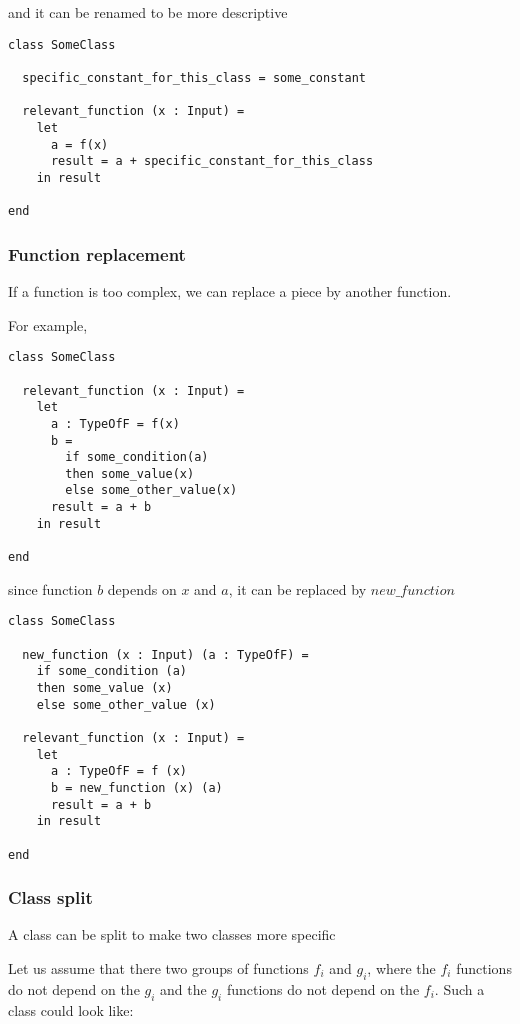 and it can be renamed to be more descriptive

\begin{lstlisting}[label={lst:rewritingFunctionExtractionAfter1}]
class SomeClass

  specific_constant_for_this_class = some_constant

  relevant_function (x : Input) =
    let
      a = f(x)
      result = a + specific_constant_for_this_class
    in result

end
\end{lstlisting}

\subsubsection{Function replacement}

If a function is too complex, we can replace a piece by another function.

For example,

\begin{lstlisting}[label={lst:rewritingFunctionReplacementBefore}]
class SomeClass

  relevant_function (x : Input) =
    let
      a : TypeOfF = f(x)
      b =
        if some_condition(a)
        then some_value(x)
        else some_other_value(x)
      result = a + b
    in result

end
\end{lstlisting}

since function $b$ depends on $x$ and $a$, it can be replaced by $new\_function$

\begin{lstlisting}[label={lst:rewritingFunctionReplacementAfter}]
class SomeClass

  new_function (x : Input) (a : TypeOfF) =
    if some_condition (a)
    then some_value (x)
    else some_other_value (x)

  relevant_function (x : Input) =
    let
      a : TypeOfF = f (x)
      b = new_function (x) (a)
      result = a + b
    in result

end
\end{lstlisting}

\subsubsection{Class split}

A class can be split to make two classes more specific

Let us assume that there two groups of functions $f_{i}$ and $g_{i}$, where the $f_{i}$ functions do not depend on the $g_{i}$ and the $g_{i}$ functions do not depend on the $f_{i}$.
Such a class could look like:

